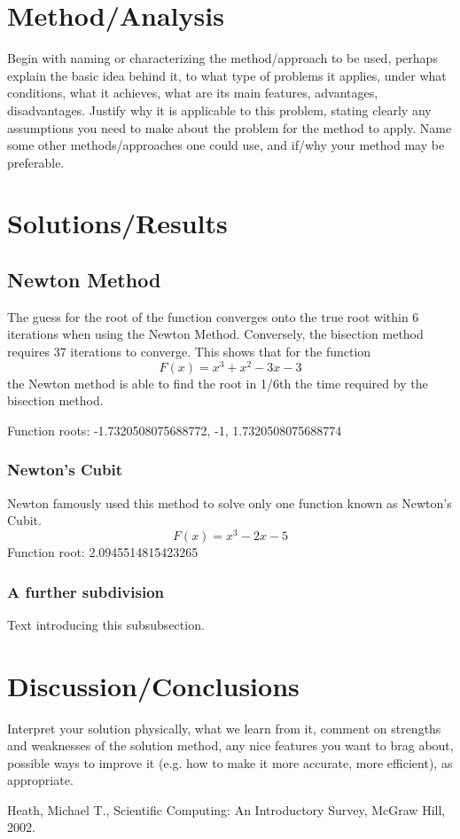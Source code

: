 \documentclass[11pt]{article}
\begin{document}
\section{Method/Analysis}\label{S:3}
Begin with naming or characterizing the method/approach to be used, perhaps explain the basic idea behind it, to what type of problems it applies, under what conditions, what it achieves, what are its main features, advantages, disadvantages. Justify why it is applicable to this problem, stating clearly any assumptions you need to make about the problem for the method to apply. Name some other methods/approaches one could use, and if/why your method may be preferable.


\section{Solutions/Results}\label{S:4}


\subsection{Newton Method}
%
The guess for the root of the function converges onto the true root within 6 iterations when using the Newton Method. Conversely, the bisection method requires 37 iterations to converge. This shows that for the function \[F(x)=x^3+x^2-3x-3\] the Newton method is able to find the root in 1/6th the time required by the bisection method.

Function roots: -1.7320508075688772, -1, 1.7320508075688774
\subsubsection{Newton's Cubit}
%
Newton famously used this method to solve only one function known as Newton's Cubit. \[F(x)=x^3-2x-5\]
Function root: 2.0945514815423265  

\subsubsection{A further subdivision}
%
Text introducing this subsubsection. 

\section{Discussion/Conclusions}\label{S:5}
Interpret your solution physically, what we learn from it, comment on strengths and weaknesses of the solution method, any nice features you want to brag about, possible ways to improve it (e.g. how to make it more accurate, more efficient), as appropriate.


\begin{thebibliography}{100}
Heath, Michael T., Scientific Computing: An Introductory Survey, McGraw Hill, 2002.
%
%

\end{thebibliography}
\end{document}
